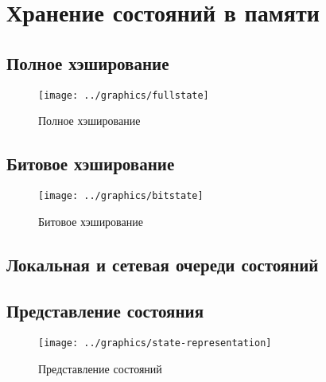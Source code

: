 \chapter{Хранение состояний в памяти}
\label{cha:state-store}

\section{Полное хэширование}
\label{sec:fullstate}

\begin{figure}[ht]
  \centering
  \texttt{[image: ../graphics/fullstate]}
  
  \caption{Полное хэширование}
  \label{fig:fullstate}
\end{figure}

\section{Битовое хэширование}
\label{sec:buthash}

\begin{figure}[ht]
  \centering
  \texttt{[image: ../graphics/bitstate]}  
  \caption{Битовое хэширование}
  \label{fig:bitstate}
\end{figure}

\section{Локальная и сетевая очереди состояний}
\label{sec:local-network-queue}


\section{Представление состояния}
\label{sec:state-represent}

\begin{figure}[ht]
  \centering
  \texttt{[image: ../graphics/state-representation]}  
  \caption{Представление состояний}
  \label{fig:state-repr}
\end{figure}

